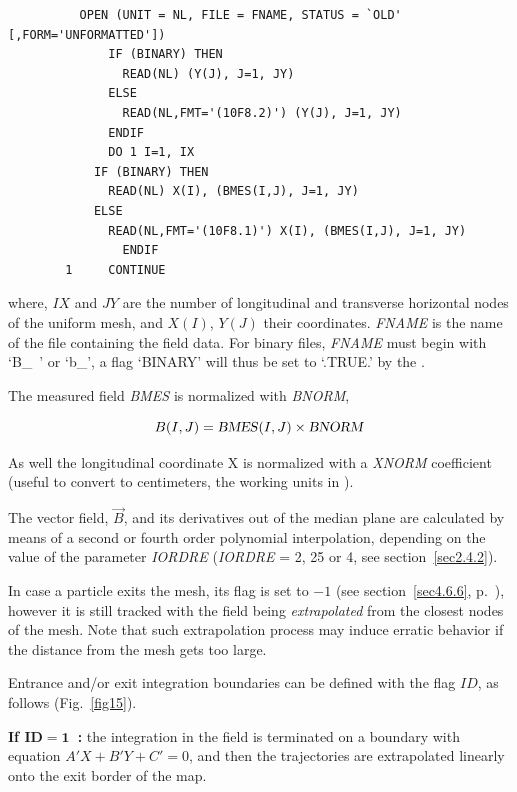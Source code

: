 {{\footnotesize
\begin{verbatim}
	      OPEN (UNIT = NL, FILE = FNAME, STATUS = `OLD' [,FORM='UNFORMATTED'])
              IF (BINARY) THEN 
                READ(NL) (Y(J), J=1, JY)
              ELSE
                READ(NL,FMT='(10F8.2)') (Y(J), J=1, JY)
              ENDIF
              DO 1 I=1, IX
	        IF (BINARY) THEN 
	          READ(NL) X(I), (BMES(I,J), J=1, JY)
	        ELSE
	          READ(NL,FMT='(10F8.1)') X(I), (BMES(I,J), J=1, JY) 
                ENDIF
        1     CONTINUE
\end{verbatim}}

\noindent where, $IX$  and $JY$  are the number of longitudinal
and transverse horizontal nodes of the uniform mesh, and $X(I)$, $Y(J)$ their coordinates.  
\textsl{FNAME} 
 is the name of the file containing the field data. For binary files, \textsl{FNAME} must begin with
\mbox{`B\_ '} or \mbox{`b\_'},  a flag `BINARY' will thus be set to `.TRUE.' by the \FORTRAN.  
\bigskip

\noindent The measured field \textsl{BMES} is normalized with \textsl{BNORM},

$$ B(I,J) = \text{\textsl{BMES}}(I,J) \times  \text{\textsl{BNORM}} $$

\noindent As well the longitudinal coordinate  X is normalized with 
a  \textsl{XNORM} coefficient (useful to convert to centimeters, the working units in  \zgoubi). 

\noindent The vector field, $ \vec  B $, and its derivatives out of the median
plane are calculated by means of a second or fourth order polynomial 
interpolation, depending on 
the value of the parameter \textsl{IORDRE} (\textsl{IORDRE} = 2, 25 or 4, 
see section~\ref{sec2.4.2}). 
\bigskip

\noindent In case a particle  exits the mesh, its \IEX{} flag is set to $-1$ (see section~\ref{sec4.6.6}, 
p.~\pageref{sec4.6.6}), however it is still tracked with the field being {\it extrapolated} from 
the closest  nodes of the mesh. Note that such extrapolation process may induce erratic behavior if the distance from the mesh gets 
too large. 

\bigskip

\noindent Entrance and/or exit integration boundaries can be defined with 
the flag $ID$, as follows (Fig.~\ref{fig15}).
\bigskip

\noindent \textbf{If  $\mathbf{ID = 1}$~:} the integration in the field 
is terminated on a boundary with equation $A'X + B'Y + C'=0 $, and 
then the trajectories are extrapolated linearly onto the exit border of the map.

}
